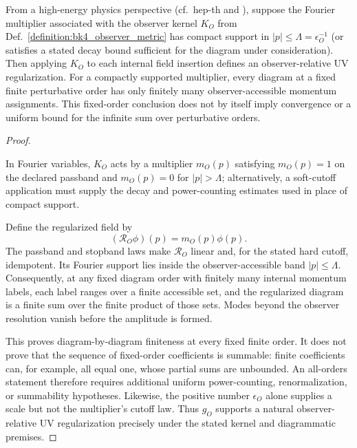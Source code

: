 \begin{proposition}\label{proposition:bk4_field_regularization}
From a high-energy physics perspective (cf.~hep-th and
\citealp{zinn2002quantum}), suppose the Fourier multiplier associated with the
observer kernel $K_O$ from Def.~\ref{definition:bk4_observer_metric} has compact
support in $|p|\leq\Lambda=\epsilon_O^{-1}$ (or satisfies a stated decay bound
sufficient for the diagram under consideration). Then applying $K_O$ to each
internal field insertion defines an observer-relative UV regularization. For a
compactly supported multiplier, every diagram at a fixed finite perturbative
order has only finitely many observer-accessible momentum assignments. This
fixed-order conclusion does not by itself imply convergence or a uniform bound
for the infinite sum over perturbative orders.
\end{proposition}

\begin{proof}
\label{proof:bk4_field_regularization}
\leavevmode

\begin{assumption}
In Fourier variables, $K_O$ acts by a multiplier $m_O(p)$ satisfying
$m_O(p)=1$ on the declared passband and $m_O(p)=0$ for
$|p|>\Lambda$; alternatively, a soft-cutoff application must supply the decay
and power-counting estimates used in place of compact support.
\end{assumption}

Define the regularized field by
\[
  (\mathcal R_O\phi)(p)=m_O(p)\phi(p).
\]
The passband and stopband laws make $\mathcal R_O$ linear and, for the stated
hard cutoff, idempotent. Its Fourier support lies inside the
observer-accessible band $|p|\leq\Lambda$. Consequently, at any fixed diagram
order with finitely many internal momentum labels, each label ranges over a
finite accessible set, and the regularized diagram is a finite sum over the
finite product of those sets. Modes beyond the observer resolution vanish
before the amplitude is formed.

This proves diagram-by-diagram finiteness at every fixed finite order. It does
not prove that the sequence of fixed-order coefficients is summable: finite
coefficients can, for example, all equal one, whose partial sums are unbounded.
An all-orders statement therefore requires additional uniform power-counting,
renormalization, or summability hypotheses. Likewise, the positive number
$\epsilon_O$ alone supplies a scale but not the multiplier's cutoff law. Thus
$g_O$ supports a natural observer-relative UV regularization precisely under
the stated kernel and diagrammatic premises.
\end{proof}

